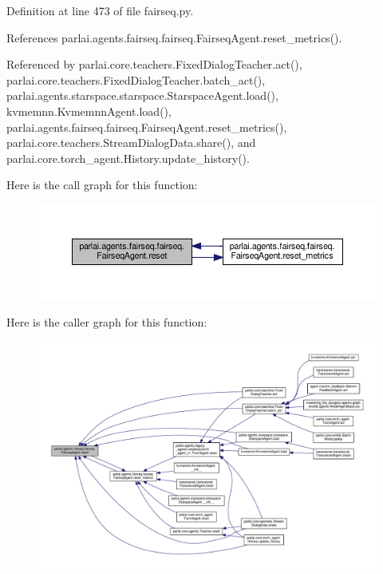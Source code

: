 Definition at line 473 of file fairseq.\+py.



References parlai.\+agents.\+fairseq.\+fairseq.\+Fairseq\+Agent.\+reset\+\_\+metrics().



Referenced by parlai.\+core.\+teachers.\+Fixed\+Dialog\+Teacher.\+act(), parlai.\+core.\+teachers.\+Fixed\+Dialog\+Teacher.\+batch\+\_\+act(), parlai.\+agents.\+starspace.\+starspace.\+Starspace\+Agent.\+load(), kvmemnn.\+Kvmemnn\+Agent.\+load(), parlai.\+agents.\+fairseq.\+fairseq.\+Fairseq\+Agent.\+reset\+\_\+metrics(), parlai.\+core.\+teachers.\+Stream\+Dialog\+Data.\+share(), and parlai.\+core.\+torch\+\_\+agent.\+History.\+update\+\_\+history().

Here is the call graph for this function\+:
\nopagebreak
\begin{figure}[H]
\begin{center}
\leavevmode
\includegraphics[width=350pt]{classparlai_1_1agents_1_1fairseq_1_1fairseq_1_1FairseqAgent_acc5aa3887a6bf3ece28d60a9572fe50e_cgraph}
\end{center}
\end{figure}
Here is the caller graph for this function\+:
\nopagebreak
\begin{figure}[H]
\begin{center}
\leavevmode
\includegraphics[width=350pt]{classparlai_1_1agents_1_1fairseq_1_1fairseq_1_1FairseqAgent_acc5aa3887a6bf3ece28d60a9572fe50e_icgraph}
\end{center}
\end{figure}
\mbox{\label{classparlai_1_1agents_1_1fairseq_1_1fairseq_1_1FairseqAgent_a029d7193a532d4cf75433e82817ab414}} 
